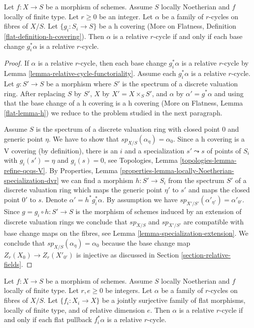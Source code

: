 \begin{lemma}
\label{lemma-relative-cycles-h-descent}
Let $f : X \to S$ be a morphism of schemes. Assume $S$ locally Noetherian
and $f$ locally of finite type. Let $r \geq 0$ be an integer. Let $\alpha$
be a family of $r$-cycles on fibres of $X/S$. Let $\{g_i : S_i \to S\}$
be a h covering (More on Flatness, Definition
\ref{flat-definition-h-covering}). Then $\alpha$ is a relative $r$-cycle
if and only if each base change $g_i^*\alpha$ is a relative $r$-cycle.
\end{lemma}

\begin{proof}
If $\alpha$ is a relative $r$-cycle, then each base change $g_i^*\alpha$ is a
relative $r$-cycle by Lemma \ref{lemma-relative-cycle-functoriality}.
Assume each $g_i^*\alpha$ is a relative $r$-cycle.
Let $g : S' \to S$ be a morphism where $S'$ is the spectrum of a discrete
valuation ring. After replacing $S$ by $S'$, $X$ by $X' = X \times_S S'$, and
$\alpha$ by $\alpha' = g^*\alpha$ and using that the base change of a
h covering is a h covering (More on Flatness, Lemma \ref{flat-lemma-h})
we reduce to the problem studied in the next paragraph.

\medskip\noindent
Assume $S$ is the spectrum of a discrete valuation ring with closed
point $0$ and generic point $\eta$. We have to show that
$sp_{X/S}(\alpha_\eta) = \alpha_0$. Since a h covering is a V covering
(by definition), there is an $i$ and a specialization $s' \leadsto s$
of points of $S_i$ with $g_i(s') = \eta$ and $g_i(s) = 0$, see
Topologies, Lemma \ref{topologies-lemma-refine-qcqs-V}. By
Properties, Lemma \ref{properties-lemma-locally-Noetherian-specialization-dvr}
we can find a morphism $h : S' \to S_i$ from the
spectrum $S'$ of a discrete valuation ring which maps
the generic point $\eta'$ to $s'$ and maps
the closed point $0'$ to $s$. Denote $\alpha' = h^*g_i^*\alpha$.
By assumption we have $sp_{X'/S'}(\alpha'_{\eta'}) = \alpha'_{0'}$.
Since $g = g_i \circ h : S' \to S$ is the morphism of schemes
induced by an extension of discrete valuation rings we conclude that
$sp_{X/S}$ and $sp_{X'/S'}$ are compatible with base change maps
on the fibres, see Lemma \ref{lemma-specialization-extension}.
We conclude that $sp_{X/S}(\alpha_\eta) = \alpha_0$ because
the base change map $Z_r(X_0) \to Z_r(X'_{0'})$ is injective
as discussed in Section \ref{section-relative-fields}.
\end{proof}

\begin{lemma}
\label{lemma-families-specialization-fppf-descent}
Let $f : X \to S$ be a morphism of schemes. Assume $S$ locally Noetherian
and $f$ locally of finite type. Let $r, e \geq 0$ be integers.
Let $\alpha$ be a family of $r$-cycles on fibres of $X/S$.
Let $\{f_i : X_i \to X\}$ be a jointly surjective family
of flat morphisms, locally of finite type, and of relative dimension $e$.
Then $\alpha$ is a relative $r$-cycle if and only if each flat
pullback $f_i^*\alpha$ is a relative $r$-cycle.
\end{lemma}

